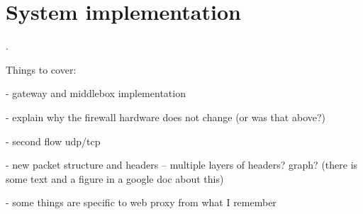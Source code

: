 
\section{System implementation} \label{sec:impl}

.

Things to cover:

- gateway and middlebox implementation

- explain why the firewall hardware does not change (or was that above?)

- second flow udp/tcp

- new packet structure and headers -- multiple layers of headers? graph? (there is some text and a figure in a google doc about this)

- some things are specific to web proxy from what I remember

